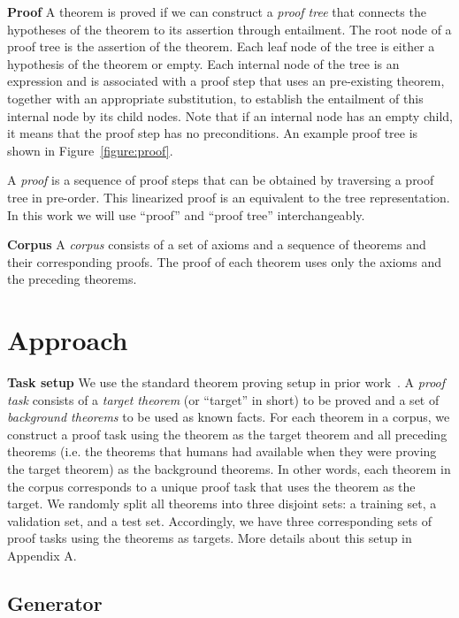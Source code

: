 \documentclass{article}
\begin{document}
\noindent\textbf{Proof}
A theorem is proved if we can construct a \emph{proof tree} that connects the hypotheses of the theorem to its assertion through entailment. 
The root node of a proof tree is the assertion of the theorem. Each leaf node of the tree is either a hypothesis of the theorem or empty. 
Each internal node of the tree is an expression and is associated with a proof step that uses an pre-existing theorem, together with an appropriate substitution, to establish the entailment of this internal node by its child nodes. 
Note that if an internal node has an empty child, it means that the proof step has no preconditions. An example proof tree is shown in Figure~\ref{figure:proof}. 

A \emph{proof} is a sequence of proof steps that can be obtained by traversing a proof tree in pre-order. This linearized proof is an equivalent to the tree representation. In this work we will use ``proof'' and ``proof tree'' interchangeably. 

\noindent\textbf{Corpus}
A \emph{corpus} consists of a set of axioms and a sequence of theorems and their corresponding proofs. The proof of each theorem uses only the axioms and the preceding theorems. 

\section{Approach}
\noindent\textbf{Task setup}
We use the standard theorem proving setup in prior work~\cite{irving2016deepmath,bansal2019holist, whalen2016holophrasm}. A \emph{proof task} consists of a \emph{target theorem} (or ``target'' in short) to be proved and a set of \emph{background theorems} to be used as known facts. 
For each theorem in a corpus, we construct a proof task using the theorem as the target theorem and all preceding theorems (i.e. the theorems that humans had available when they were proving the target theorem) as the background theorems. In other words, each theorem in the corpus corresponds to a unique proof task that uses the theorem as the target.  We randomly split all theorems into three disjoint sets: a training set, a validation set, and a test set. Accordingly, we have three corresponding sets of proof tasks using the theorems as targets. More details about this setup in Appendix A.   

\subsection{Generator}
\label{sec:gen}
\end{document}
